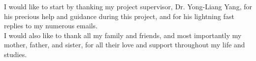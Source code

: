 I would like to start by thanking my project supervisor, Dr. Yong-Liang Yang, for his precious help and guidance during this project, and for his lightning fast replies to my numerous emails.\\

I would also like to thank all my family and friends, and most importantly my mother, father, and sister, for all their love and support throughout my life and studies.
